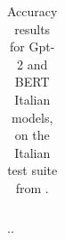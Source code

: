 \begin{table}
\begin{center}
\begin{tabular}{p{0.095\linewidth}|p{0.099\linewidth}|c|p{0.04\linewidth}|c|p{0.04\linewidth}|p{0.04\linewidth}|p{0.04\linewidth}|c|p{0.04\linewidth}|c|p{0.04\linewidth}|}
		\end{tabular}
		\caption{Accuracy results for Gpt-2 and BERT Italian models, on the Italian test suite from \citet{sprouse2016experimental}.}
		\label{tab:accuracy_it_data_sprouse}
	\end{center}
\end{table}

..






